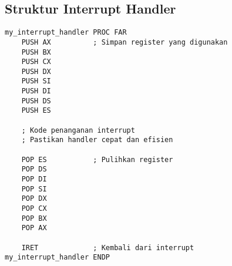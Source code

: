 \documentclass[../main.tex]{subfiles}
\begin{document}
        \subsection{Struktur Interrupt Handler}
            \begin{lstlisting}[language={[x86masm]Assembler}, caption=Template Interrupt Handler, label={lst:interrupt-template}]
my_interrupt_handler PROC FAR
    PUSH AX          ; Simpan register yang digunakan
    PUSH BX
    PUSH CX
    PUSH DX
    PUSH SI
    PUSH DI
    PUSH DS
    PUSH ES
    
    ; Kode penanganan interrupt
    ; Pastikan handler cepat dan efisien
    
    POP ES           ; Pulihkan register
    POP DS
    POP DI
    POP SI
    POP DX
    POP CX
    POP BX
    POP AX
    
    IRET             ; Kembali dari interrupt
my_interrupt_handler ENDP
            \end{lstlisting}
\end{document}
